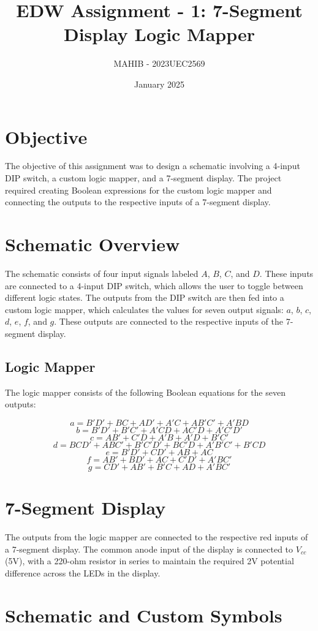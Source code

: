 \documentclass[a4paper,10pt]{article}
\title{EDW Assignment - 1: 7-Segment Display Logic Mapper}
\author{MAHIB - 2023UEC2569}
\date{January 2025}
\begin{document}
\maketitle

\section*{Objective}
The objective of this assignment was to design a schematic involving a 4-input DIP switch, a custom logic mapper, and a 7-segment display. The project required creating Boolean expressions for the custom logic mapper and connecting the outputs to the respective inputs of a 7-segment display.

\section*{Schematic Overview}
The schematic consists of four input signals labeled \(A\), \(B\), \(C\), and \(D\). These inputs are connected to a 4-input DIP switch, which allows the user to toggle between different logic states. The outputs from the DIP switch are then fed into a custom logic mapper, which calculates the values for seven output signals: \(a\), \(b\), \(c\), \(d\), \(e\), \(f\), and \(g\). These outputs are connected to the respective inputs of the 7-segment display.

\subsection*{Logic Mapper}
The logic mapper consists of the following Boolean equations for the seven outputs:

\[
a = B'D' + BC + AD' + A'C + AB'C' + A'BD
\]
\[
b = B'D' + B'C' + A'CD + AC'D + A'C'D'
\]
\[
c = AB' + C'D + A'B + A'D + B'C'
\]
\[
d = BCD' + ABC' + B'C'D' + BC'D + A'B'C' + B'CD
\]
\[
e = B'D' + CD' + AB + AC
\]
\[
f = AB' + BD' + AC + C'D' + A'BC'
\]
\[
g = CD' + AB' + B'C + AD + A'BC'
\]

\section*{7-Segment Display}
The outputs from the logic mapper are connected to the respective red inputs of a 7-segment display. The common anode input of the display is connected to \(V_{cc}\) (5V), with a 220-ohm resistor in series to maintain the required 2V potential difference across the LEDs in the display.

\section*{Schematic and Custom Symbols}
\end{document}
